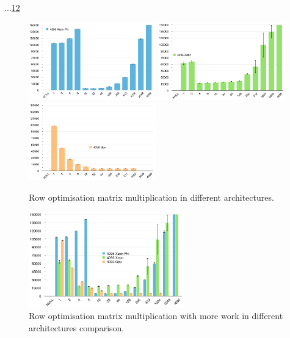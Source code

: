 \par{...\ref{Rows}\ref{RowsComp}}

\begin{figure}[!h]
    \centering
    \includegraphics[width=0.49\textwidth]{figures/opt2_phi.png}
    \includegraphics[width=0.49\textwidth]{figures/opt2_cpu.png}
    \includegraphics[width=0.49\textwidth]{figures/opt2_gpu.png}
    \caption{Row optimisation matrix multiplication in different architectures.}
    \label{Rows}
\end{figure}

\begin{figure}[!h]
    \centering
    \includegraphics[width=0.6\textwidth]{figures/opt2_comp.png}
    \caption{Row optimisation matrix multiplication with more work in different architectures comparison.}
    \label{RowsComp}
\end{figure}

